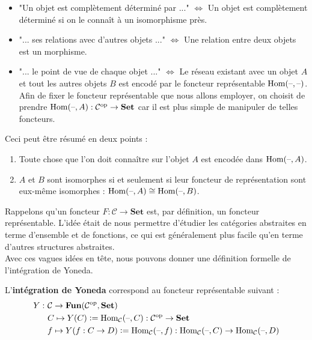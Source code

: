 \documentclass{article}
\begin{document}
\begin{itemize}[label=\textbullet]
    \item "Un objet est complètement déterminé par ..." $\Leftrightarrow$ Un objet est complètement déterminé si on le connaît à un isomorphisme près.
    \item "... ses relations avec d'autres objets ..." $\Leftrightarrow$ Une relation entre deux objets est un morphisme.
    \item "... le point de vue de chaque objet ..." $\Leftrightarrow$ Le réseau existant avec un objet $A$ et tout les autres objets $B$ est encodé par le foncteur représentable $\text{Hom}(\text{--},\text{--})$. Afin de fixer le foncteur représentable que nous allons employer, on choisit de prendre $\text{Hom}(\text{--}, A):\mathcal C^\text{op}\to\textbf{Set}$ car il est plus simple de manipuler de telles foncteurs.
\end{itemize}

\noindent
Ceci peut être résumé en deux points :

\begin{enumerate}
    \item Toute chose que l'on doit connaître sur l'objet $A$ est encodée dans $\text{Hom}(\text{--}, A)$.
    \item $A$ et $B$ sont isomorphes si et seulement si leur foncteur de représentation sont eux-même isomorphes : $\text{Hom}(\text{--}, A)\cong\text{Hom}(\text{--}, B)$.
\end{enumerate}

Rappelons qu'un foncteur $F:\mathcal C\to\textbf{Set}$ est, par définition, un foncteur représentable. L'idée était de nous permettre d'étudier les catégories abstraites en terme d'ensemble et de fonctions, ce qui est généralement plus facile qu'en terme d'autres structures abstraites.\\

Avec ces vagues idées en tête, nous pouvons donner une définition formelle de l'intégration de Yoneda.

\begin{definition}{}
    L'\textbf{intégration de Yoneda} correspond au foncteur représentable suivant :
    \begin{equation*}
    \begin{aligned}
        Y:\ &\mathcal C\to\textbf{Fun}(\mathcal C^\text{op}, \textbf{Set})\\
            &C\mapsto Y(C)\vcentcolon=\text{Hom}_\mathcal C(\text{--},C):\mathcal C^\text{op}\to\textbf{Set}\\
            &f\mapsto Y(f:C\to D)\vcentcolon=\text{Hom}_\mathcal C(\text{--}, f):\text{Hom}_\mathcal C(\text{--},C)\to\text{Hom}_\mathcal C(\text{--}, D)
    \end{aligned}
    \end{equation*}
\end{definition}
\end{document}
